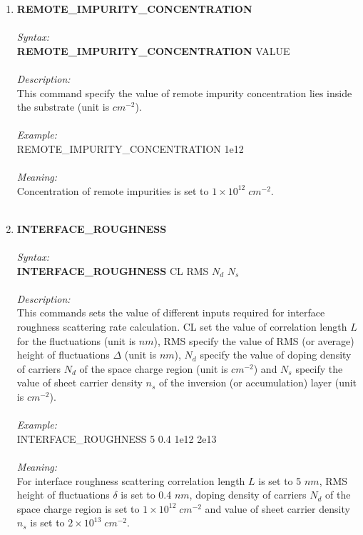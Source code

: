 \documentclass[12pt]{article}
\begin{document}
\begin{enumerate}
    \item \textbf{REMOTE\_IMPURITY\_CONCENTRATION} \\ \\
    \textit{Syntax:} \\
    \textbf{REMOTE\_IMPURITY\_CONCENTRATION} VALUE \\ \\
    \textit{Description:} \\
    This command specify the value of remote impurity concentration lies inside the substrate (unit is $cm^{-2}$).\\ \\
    \textit{Example:} \\
    REMOTE\_IMPURITY\_CONCENTRATION 1e12 \\ \\
    \textit{Meaning:} \\  
    Concentration of remote impurities is set to $1 \times 10^{12} \; cm^{-2}$. \\ \\

    \item \textbf{INTERFACE\_ROUGHNESS}  \\ \\
    \textit{Syntax:} \\
    \textbf{INTERFACE\_ROUGHNESS} CL RMS $N_d$ $N_s$ \\ \\
    \textit{Description:} \\
    This commands sets the value of different inputs required for interface roughness scattering rate calculation. CL set the value of correlation length $L$ for the fluctuations (unit is $nm$), RMS specify the value of RMS (or average) height of fluctuations $\Delta$ (unit is $nm$), $N_d$ specify the value of doping density of carriers $N_d$ of the space charge region (unit is $cm^{-2}$) and $N_s$ specify the value of sheet carrier density $n_s$ of the inversion (or accumulation) layer (unit is $cm^{-2}$). \\ \\  
    \textit{Example:} \\
    INTERFACE\_ROUGHNESS 5 0.4 1e12 2e13 \\ \\
    \textit{Meaning:} \\    
    For interface roughness scattering correlation length $L$ is set to 5 $nm$, RMS height of fluctuations $\delta$ is set to 0.4 $nm$, doping density of carriers $N_d$ of the space charge region is set to $1 \times 10^{12} \; cm^{-2}$ and value of sheet carrier density $n_s$ is set to $2 \times 10^{13} \; cm^{-2}$. \\ \\
    

\end{enumerate}
\end{document}
